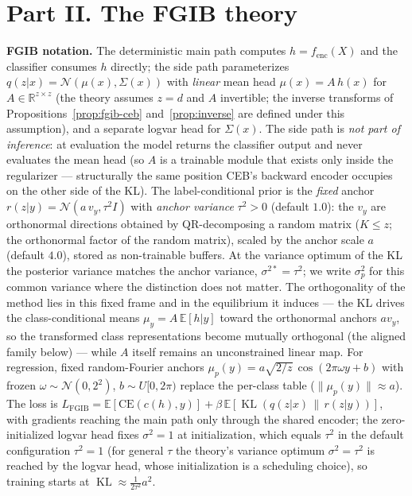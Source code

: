 \section*{Part II. The FGIB theory}

\textbf{FGIB notation.}
The deterministic main path computes $h = f_{\mathrm{enc}}(X)$ and the classifier
consumes $h$ directly; the side path parameterizes $q(z|x) = \mathcal{N}(\mu(x),
\Sigma(x))$ with \emph{linear} mean head $\mu(x) = A\,h(x)$ for
$A \in \mathbb{R}^{z \times z}$ (the theory assumes $z = d$ and $A$ invertible; the
inverse transforms of Propositions~\ref{prop:fgib-ceb} and~\ref{prop:inverse} are
defined under this assumption), and a separate logvar head for $\Sigma(x)$. The
side path is \emph{not part of inference}: at evaluation the model returns the classifier
output and never evaluates the mean head (so $A$ is a trainable module that exists only
inside the regularizer --- structurally the same position CEB's backward encoder
occupies on the other side of the KL). The label-conditional prior is the
\emph{fixed} anchor
$r(z|y) = \mathcal{N}(a\,v_y, \tau^2 I)$ with \emph{anchor variance} $\tau^2 > 0$
(default $1.0$): the $v_y$ are orthonormal directions obtained by
QR-decomposing a random matrix ($K \le z$; the orthonormal factor of the random matrix),
scaled by the anchor scale $a$ (default $4.0$), stored as
non-trainable buffers. At the variance optimum of the KL the posterior variance matches
the anchor variance, $\sigma^{2*} = \tau^2$; we write $\sigma_p^2$ for this common
variance where the distinction does not matter. The orthogonality of the method lies in
this fixed frame and in the equilibrium it induces --- the KL drives the
class-conditional means $\mu_y = A\,\mathbb{E}[h|y]$ toward the orthonormal anchors
$a v_y$, so the transformed class representations become mutually orthogonal (the
aligned family below) --- while $A$ itself remains an unconstrained linear map. For
regression, fixed random-Fourier anchors
$\mu_p(y) = a\sqrt{2/z}\,\cos(2\pi\omega y + b)$ with frozen
$\omega \sim \mathcal{N}(0, 2^2)$, $b \sim U[0, 2\pi)$ replace the per-class table
($\|\mu_p(y)\| \approx a$). The loss is
$L_{\mathrm{FGIB}} = \mathbb{E}[\mathrm{CE}(c(h), y)]
+ \beta\,\mathbb{E}[\operatorname{KL}(q(z|x)\,\|\,r(z|y))]$, with gradients reaching the
main path only through the shared encoder; the zero-initialized logvar head fixes
$\sigma^2 = 1$ at initialization, which equals $\tau^2$ in the default configuration
$\tau^2 = 1$ (for general $\tau$ the theory's variance optimum $\sigma^2 = \tau^2$ is
reached by the logvar head, whose initialization is a scheduling choice), so training
starts at $\operatorname{KL} \approx \tfrac{1}{2\tau^2} a^2$.


